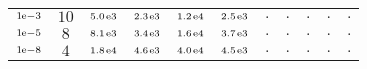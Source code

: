 \begin{tiny}
\begin{tabular}{@{$\;$}c@{$\;$}|@{$\;$}c@{$\;$}@{$\;$}c@{$\;$}@{$\;$}c@{$\;$}@{$\;$}c@{$\;$}@{$\;$}c@{$\;$}|@{$\;$}c@{$\;$}@{$\;$}c@{$\;$}@{$\;$}c@{$\;$}@{$\;$}c@{$\;$}@{$\;$}c@{$\;$}}
$\scriptstyle1\!\mathrm{\hspace{0.10em}e}-3$ & $\scriptstyle10$ & $\scriptstyle5.0\mathrm{\hspace{0.10em}e}3$ & $\scriptstyle2.3\mathrm{\hspace{0.10em}e}3$ & $\scriptstyle1.2\mathrm{\hspace{0.10em}e}4$ & $\scriptstyle2.5\mathrm{\hspace{0.10em}e}3$ & $\scriptstyle.$ & $\scriptstyle.$ & $\scriptstyle.$ & $\scriptstyle.$ & $\scriptstyle.$\\ 
$\scriptstyle1\!\mathrm{\hspace{0.10em}e}-5$ & $\scriptstyle8$ & $\scriptstyle8.1\mathrm{\hspace{0.10em}e}3$ & $\scriptstyle3.4\mathrm{\hspace{0.10em}e}3$ & $\scriptstyle1.6\mathrm{\hspace{0.10em}e}4$ & $\scriptstyle3.7\mathrm{\hspace{0.10em}e}3$ & $\scriptstyle.$ & $\scriptstyle.$ & $\scriptstyle.$ & $\scriptstyle.$ & $\scriptstyle.$\\ 
$\scriptstyle1\!\mathrm{\hspace{0.10em}e}-8$ & $\scriptstyle4$ & $\scriptstyle1.8\mathrm{\hspace{0.10em}e}4$ & $\scriptstyle4.6\mathrm{\hspace{0.10em}e}3$ & $\scriptstyle4.0\mathrm{\hspace{0.10em}e}4$ & $\scriptstyle4.5\mathrm{\hspace{0.10em}e}3$ & $\scriptstyle.$ & $\scriptstyle.$ & $\scriptstyle.$ & $\scriptstyle.$ & $\scriptstyle.$\\ 
\end{tabular} 
\end{tiny} 
